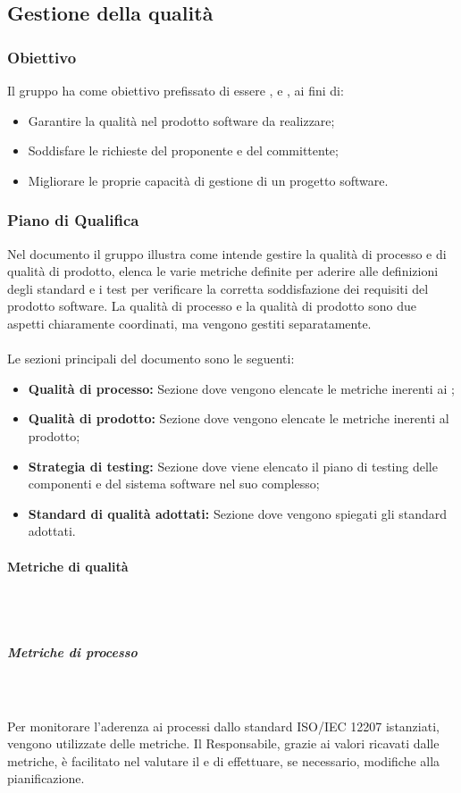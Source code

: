 \subsection{Gestione della qualità}
\subsubsection{Obiettivo}
Il gruppo \Gruppo{} ha come obiettivo prefissato di essere ,  e , ai fini di:
\begin{itemize}
    \item Garantire la qualità nel prodotto software da realizzare;
    \item Soddisfare le richieste del proponente e del committente;
    \item Migliorare le proprie capacità di gestione di un progetto software.
\end{itemize}

\subsubsection{Piano di Qualifica}
Nel documento \PdQ{} il gruppo \Gruppo{} illustra come intende gestire la qualità di processo e di qualità di prodotto, elenca le varie metriche definite per aderire alle definizioni degli standard e i test per verificare la corretta soddisfazione dei requisiti del prodotto software.
La qualità di processo e la qualità di prodotto sono due aspetti chiaramente coordinati, ma vengono gestiti separatamente. \\ \\
Le sezioni principali del documento sono le seguenti:
\begin{itemize}
    \item \textbf{Qualità di processo:} Sezione dove vengono elencate le metriche inerenti ai ;
    \item \textbf{Qualità di prodotto:} Sezione dove vengono elencate le metriche inerenti al prodotto;
    \item \textbf{Strategia di testing:} Sezione dove viene elencato il piano di testing delle componenti e del sistema software nel suo complesso;
    \item \textbf{Standard di qualità adottati:} Sezione dove vengono spiegati gli standard adottati.
\end{itemize}

\paragraph{Metriche di qualità}\mbox{}\\ \\
\subparagraph{Metriche di processo}\mbox{}\\ \\
Per monitorare l'aderenza ai processi dallo standard ISO/IEC 12207 istanziati, vengono utilizzate delle metriche. Il Responsabile, grazie ai valori ricavati dalle metriche, è facilitato nel
valutare il  e di effettuare, se necessario, modifiche alla pianificazione.\\

